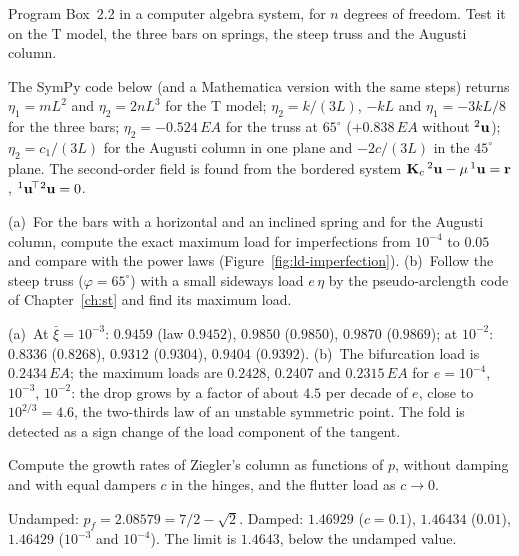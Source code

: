 
\label{exo:ld-computer-koiter}
%
Program Box~2.2 in a computer algebra system, for $n$ degrees of freedom. Test it on
the T model, the three bars on springs, the steep truss and the Augusti column.
\begin{solution}
The SymPy code below (and a Mathematica version with the same steps) returns
$\eta_1 = mL^2$ and $\eta_2 = 2nL^3$ for the T model; $\eta_2 = k/(3L)$, $-kL$ and
$\eta_1 = -3kL/8$ for the three bars; $\eta_2 = -0.524\,EA$ for the truss at $65^\circ$
($+0.838\,EA$ without ${}^2\mathbf{u}$); $\eta_2 = c_1/(3L)$ for the Augusti column in one
plane and $-2c/(3L)$ in the $45^\circ$ plane. The second-order field is found from the
bordered system $\mathbf{K}_c\,{}^2\mathbf{u} - \mu\,{}^1\mathbf{u} = \mathbf{r}$,
${}^1\mathbf{u}^{\!\top}{}^2\mathbf{u} = 0$.

\end{solution}

\label{exo:ld-computer-imperfection}
%
(a)~For the bars with a horizontal and an inclined spring and for the Augusti column,
compute the exact maximum load for imperfections from $10^{-4}$ to $0.05$ and compare
with the power laws (Figure~\ref{fig:ld-imperfection}). (b)~Follow the steep truss
($\varphi = 65^\circ$) with a small sideways load $e\,\eta$ by the pseudo-arclength
code of Chapter~\ref{ch:st} and find its maximum load.
\begin{solution}
(a)~At $\bar\xi = 10^{-3}$: $0.9459$ (law $0.9452$), $0.9850$ ($0.9850$), $0.9870$ ($0.9869$);
at $10^{-2}$: $0.8336$ ($0.8268$), $0.9312$ ($0.9304$), $0.9404$ ($0.9392$).
(b)~The bifurcation load is $0.2434\,EA$; the maximum loads are $0.2428$, $0.2407$ and
$0.2315\,EA$ for $e = 10^{-4}$, $10^{-3}$, $10^{-2}$: the drop grows by a factor of about
$4.5$ per decade of $e$, close to $10^{2/3} = 4.6$, the two-thirds law of an unstable
symmetric point. The fold is detected as a sign change of the load component of
the tangent.

\end{solution}

\label{exo:ld-computer-ziegler}
%
Compute the growth rates of Ziegler's column as functions of $p$, without damping and
with equal dampers $c$ in the hinges, and the flutter load as $c \to 0$.
\begin{solution}
Undamped: $p_f = 2.08579 = 7/2 - \sqrt2$. Damped: $1.46929$ ($c = 0.1$), $1.46434$
($0.01$), $1.46429$ ($10^{-3}$ and $10^{-4}$). The limit is $1.4643$, below the undamped value.

\end{solution}

